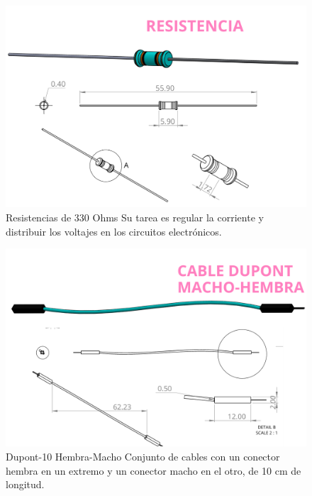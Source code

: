     \begin{figure}[H]
        \centering
        \includegraphics[scale=0.3]{34/img/resistencia.png}
        \caption{Resistencias de 330 Ohms Su tarea es regular la corriente y distribuir los voltajes en los circuitos electrónicos.}
        \label{fig:resistencia1}
    \end{figure}
    
    \begin{figure}[H]
        \centering
        \includegraphics[scale=0.3]{34/img/dupontMachoHembra.png}
        \caption{Dupont-10 Hembra-Macho Conjunto de cables con un conector hembra en un extremo y un conector macho en el otro, de 10 cm de longitud.}
        \label{fig:resistencia2}
    \end{figure}
    
